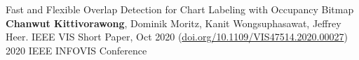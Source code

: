 \begin{cvpubs}


  \cvpub
    {Fast and Flexible Overlap Detection for Chart Labeling with Occupancy Bitmap} %
    {\textbf{Chanwut Kittivorawong}, Dominik Moritz, Kanit Wongsuphasawat, Jeffrey Heer. IEEE VIS Short Paper, Oct 2020 (\href{https://doi.org/10.1109/VIS47514.2020.00027}{doi.org/10.1109/VIS47514.2020.00027})} %
    {2020} %
    {IEEE INFOVIS Conference} %

\end{cvpubs}
